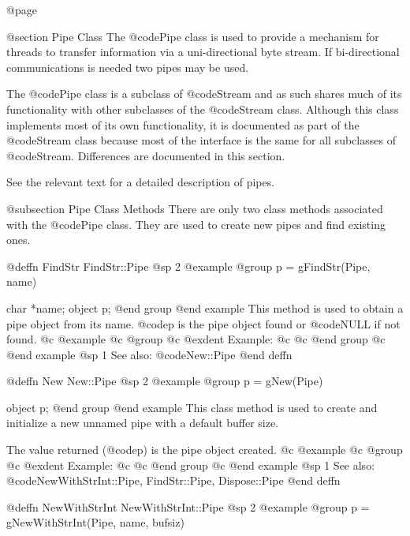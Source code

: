 @page

@section Pipe Class
The @code{Pipe} class is used to provide a mechanism for threads
to transfer information via a uni-directional byte stream.  If
bi-directional communications is needed two pipes may be used.

The @code{Pipe} class is a subclass of @code{Stream} and as such shares
much of its functionality with other subclasses of the @code{Stream}
class.  Although this class implements most of its own functionality, it
is documented as part of the @code{Stream} class because most of the
interface is the same for all subclasses of @code{Stream}.  Differences
are documented in this section.


See the relevant text for a detailed description of pipes.





@subsection Pipe Class Methods
There are only two class methods associated with the @code{Pipe} class.
They are used to create new pipes and find existing ones.








@deffn {FindStr} FindStr::Pipe
@sp 2
@example
@group
p = gFindStr(Pipe, name)

char    *name;
object  p;
@end group
@end example
This method is used to obtain a pipe object from its name.  @code{p}
is the pipe object found or @code{NULL} if not found.
@c @example
@c @group
@c @exdent Example:
@c 
@c @end group
@c @end example
@sp 1
See also:  @code{New::Pipe}
@end deffn





@deffn {New} New::Pipe
@sp 2
@example
@group
p = gNew(Pipe)

object  p;
@end group
@end example
This class method is used to create and initialize a new unnamed pipe
with a default buffer size.

The value returned (@code{p}) is the pipe object created.
@c @example
@c @group
@c @exdent Example:
@c 
@c @end group
@c @end example
@sp 1
See also:  @code{NewWithStrInt::Pipe, FindStr::Pipe, Dispose::Pipe}
@end deffn










@deffn {NewWithStrInt} NewWithStrInt::Pipe
@sp 2
@example
@group
p = gNewWithStrInt(Pipe, name, bufsiz)


